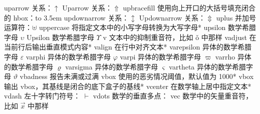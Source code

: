 \capcs uparrow {关系：$\uparrow$}{}{}
\capcs Uparrow {关系：$\Uparrow$}{}{}
\capcs upbracefill {使用向上开口的大括号填充闭合的 hbox：\hbox to 3.5em{\upbracefill}}{}{}
\capcs updownarrow {关系：$\updownarrow$}{}{}
\capcs Updownarrow {关系：$\Updownarrow$}{}{}
\capcs uplus {并加号运算符：$\uplus$}{}{}
\capcs uppercase {将指定文本中的小写字母转换为大写字母}*{}
\capcs upsilon {数学希腊字母 $\upsilon$}{}{}
\capcs Upsilon {数学希腊字母 $\Upsilon$}{}{}
\capcs v {文本中的抑制重音符，比如 \v o 中那样}{}{}
\capcs vadjust {在当前行后输出垂直模式内容}*{}
\capcs valign {在行中对齐文本}*{}
\capcs varepsilon {异体的数学希腊字母 $\varepsilon$}{}{}
\capcs varphi {异体的数学希腊字母 $\varphi$}{}{}
\capcs varpi {异体的数学希腊字母 $\varpi$}{}{}
\capcs varrho {异体的数学希腊字母 $\varrho$}{}{}
\capcs varsigma {异体的数学希腊字母 $\varsigma$}{}{}
\capcs vartheta {异体的数学希腊字母 $\vartheta$}{}{}
\capcs vbadness {报告未满或过满 vbox 使用的恶劣情况阈值，默认值为 1000}*{}
\capcs vbox {输出 vbox，其基线是闭合的底下盒子的基线}*{}
\capcs vcenter {在数学轴上居中指定文本}*{}
\capcs vdash {左十字转门符号： $\vdash$}{}{}
\capcs vdots {数学的垂直多点：\smash{$\vdots$}}{}{}
\capcs vec {数学中的矢量重音符，比如 $\vec x$ 中那样}{}{}
